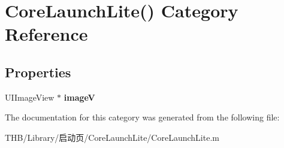 \hypertarget{category_core_launch_lite_07_08}{}\section{Core\+Launch\+Lite() Category Reference}
\label{category_core_launch_lite_07_08}
\subsection*{Properties}
\begin{DoxyCompactItemize}
\item 
\mbox{\label{category_core_launch_lite_07_08_aab20dfbbf1e96cf1e0601944b3b8e97c}} 
U\+I\+Image\+View $\ast$ {\bfseries imageV}
\end{DoxyCompactItemize}


The documentation for this category was generated from the following file\+:\begin{DoxyCompactItemize}
\item 
T\+H\+B/\+Library/启动页/\+Core\+Launch\+Lite/Core\+Launch\+Lite.\+m\end{DoxyCompactItemize}
